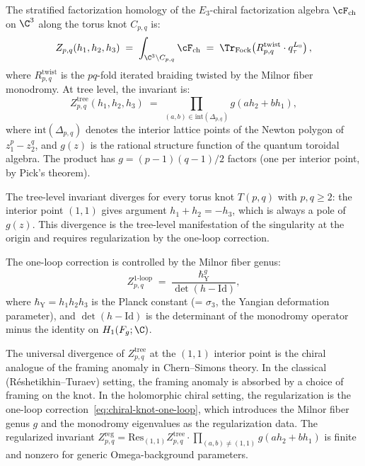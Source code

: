\begin{conjecture}
\label{conj:chiral-knot-invariant}
\ClaimStatusConjectured
The stratified factorization homology of the $E_3$-chiral factorization algebra $\cF_{\mathrm{ch}}$ on $\C^3$ along the torus knot $C_{p,q}$ is:
\[
 Z_{p,q}(h_1, h_2, h_3) \;=\; \int_{\C^3 \setminus C_{p,q}} \cF_{\mathrm{ch}} \;=\; \Tr_{\mathrm{Fock}}\!\left(R_{p,q}^{\mathrm{twist}} \cdot q_\tau^{L_0}\right),
\]
where $R_{p,q}^{\mathrm{twist}}$ is the $pq$-fold iterated braiding twisted by the Milnor fiber monodromy. At tree level, the invariant is:
\begin{equation}\label{eq:chiral-knot-tree}
 Z_{p,q}^{\mathrm{tree}}(h_1, h_2, h_3) \;=\; \prod_{(a,b) \in \mathrm{int}(\Delta_{p,q})} g(a h_2 + b h_1),
\end{equation}
where $\mathrm{int}(\Delta_{p,q})$ denotes the interior lattice points of the Newton polygon of $z_1^p - z_2^q$, and $g(z)$ is the rational structure function of the quantum toroidal algebra. The product has $g = (p-1)(q-1)/2$ factors (one per interior point, by Pick's theorem).

The tree-level invariant diverges for every torus knot $T(p,q)$ with $p, q \geq 2$: the interior point $(1,1)$ gives argument $h_1 + h_2 = -h_3$, which is always a pole of $g(z)$. This divergence is the tree-level manifestation of the singularity at the origin and requires regularization by the one-loop correction.

The one-loop correction is controlled by the Milnor fiber genus:
\begin{equation}\label{eq:chiral-knot-one-loop}
 Z_{p,q}^{1\text{-loop}} \;=\; \frac{\hbar_{\mathrm{Y}}^g}{\det(h - \mathrm{Id})},
\end{equation}
where $\hbar_{\mathrm{Y}} = h_1 h_2 h_3$ is the Planck constant (= $\sigma_3$, the Yangian deformation parameter), and $\det(h - \mathrm{Id})$ is the determinant of the monodromy operator minus the identity on $H_1(F_g; \C)$.
\end{conjecture}

\begin{remark}
\label{rem:tree-level-divergence}
The universal divergence of $Z_{p,q}^{\mathrm{tree}}$ at the $(1,1)$ interior point is the chiral analogue of the framing anomaly in Chern--Simons theory. In the classical (R\'{e}shetikhin--Turaev) setting, the framing anomaly is absorbed by a choice of framing on the knot. In the holomorphic chiral setting, the regularization is the one-loop correction~\eqref{eq:chiral-knot-one-loop}, which introduces the Milnor fiber genus $g$ and the monodromy eigenvalues as the regularization data. The regularized invariant $Z_{p,q}^{\mathrm{reg}} = \mathrm{Res}_{(1,1)} Z_{p,q}^{\mathrm{tree}} \cdot \prod_{(a,b) \neq (1,1)} g(a h_2 + b h_1)$ is finite and nonzero for generic Omega-background parameters.
\end{remark}


